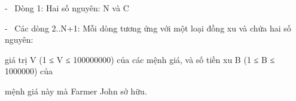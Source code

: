 -  Dòng 1: Hai số nguyên: N và C  

   -  Các dòng 2..N+1: Mỗi dòng tương ứng với một loại đồng xu và chứa hai số nguyên:  

   giá trị V (1 ≤ V ≤ 100000000) của các mệnh giá, và số tiền xu B (1 ≤ B ≤ 1000000) của  

   mệnh giá này mà Farmer John sở hữu.  

\